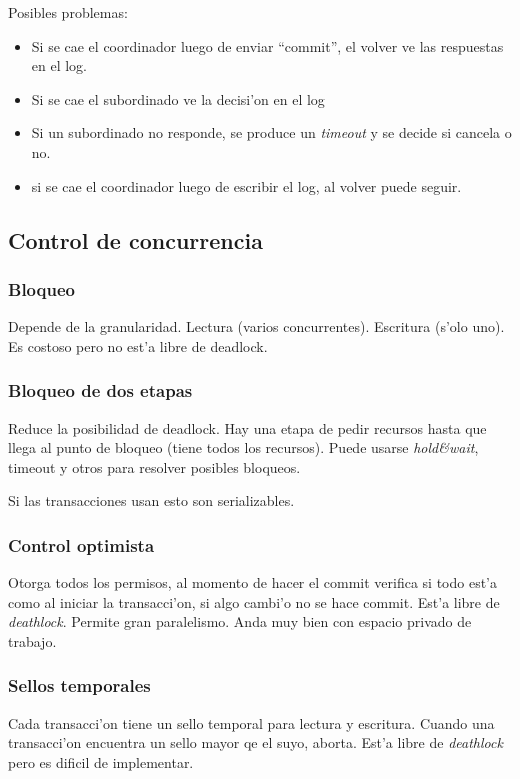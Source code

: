 \documentclass[a4paper,spanish]{article}
\begin{document}
Posibles problemas:
\begin{itemize}
	\item Si se cae el coordinador luego de enviar ``commit'', el volver
ve las respuestas en el log.
	\item Si se cae el subordinado ve la decisi'on en el log
	\item Si un subordinado no responde, se produce un \emph{timeout} y se
decide si cancela o no.
	\item si se cae el coordinador luego de escribir el log, al volver
puede seguir.
\end{itemize}

\subsection{Control de concurrencia}
\subsubsection{Bloqueo}
Depende de la granularidad. Lectura (varios concurrentes). Escritura (s'olo
uno). Es costoso pero no est'a libre de deadlock.

\subsubsection*{Bloqueo de dos etapas}
Reduce la posibilidad de deadlock. Hay una etapa de pedir recursos hasta que
llega al punto de bloqueo (tiene todos los recursos). Puede usarse
\emph{hold\&wait}, timeout y otros para resolver posibles bloqueos.

Si las transacciones usan esto son serializables.

\subsubsection{Control optimista}
Otorga todos los permisos, al momento de hacer el commit verifica si todo est'a
como al iniciar la transacci'on, si algo cambi'o no se hace commit. Est'a libre
de \emph{deathlock}. Permite gran paralelismo. Anda muy bien con espacio
privado de trabajo.

\subsubsection{Sellos temporales}
Cada transacci'on tiene un sello temporal para lectura y escritura. Cuando una
transacci'on encuentra un sello mayor qe el suyo, aborta. Est'a libre de
\emph{deathlock} pero es dificil de implementar.
\end{document}

